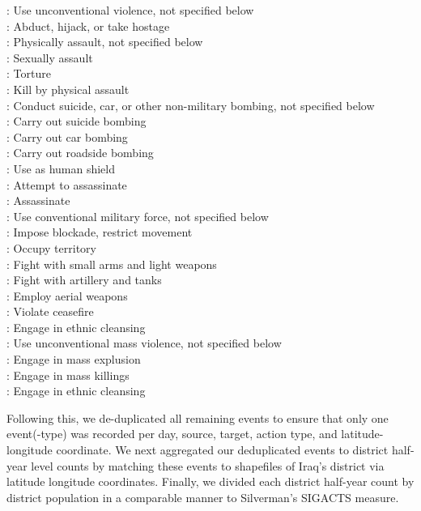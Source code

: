 \documentclass[12pt]{article}
\begin{document}
\begin{singlespace}
: Use unconventional violence, not specified below\\
: Abduct, hijack, or take hostage\\
: Physically assault, not specified below\\
: Sexually assault\\
: Torture\\
: Kill by physical assault\\
: Conduct suicide, car, or other non-military bombing, not specified below\\
: Carry out suicide bombing\\
: Carry out car bombing\\
: Carry out roadside bombing\\
: Use as human shield\\
: Attempt to assassinate\\
: Assassinate\\
: Use conventional military force, not specified below\\
: Impose blockade, restrict movement\\
: Occupy territory\\
: Fight with small arms and light weapons\\
: Fight with artillery and tanks\\
: Employ aerial weapons\\
: Violate ceasefire\\
: Engage in ethnic cleansing\\
: Use unconventional mass violence, not specified below\\
: Engage in mass explusion\\
: Engage in mass killings\\
: Engage in ethnic cleansing\\
\end{singlespace}

Following this, we de-duplicated all remaining events to ensure that only one event(-type) was recorded  per day, source, target, action type, and latitude-longitude coordinate. We next aggregated our deduplicated events to district half-year level counts by matching these events to shapefiles of Iraq's district via latitude longitude coordinates. Finally, we divided each district half-year count by district population in a comparable manner to Silverman's SIGACTS measure.
\end{document}
